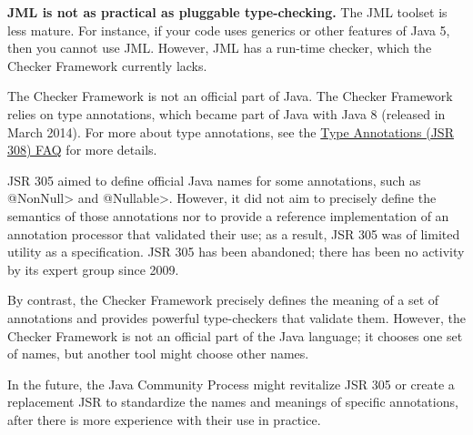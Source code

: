 \textbf{JML is not as practical as pluggable type-checking.}
The JML toolset is less mature.  For instance, if your code uses
generics or other features of Java 5, then you cannot use JML.
However, JML has a run-time checker, which the Checker Framework currently
lacks.



The Checker Framework is not an official part of Java.
The Checker Framework relies on type annotations, which became part of Java
with Java 8 (released in March 2014).  For more about type annotations, see the
\href{https://checkerframework.org/jsr308/jsr308-faq.html#pluggable-type-checking-in-java}{Type
  Annotations (JSR 308) FAQ} for more details.



JSR 305 aimed to define official Java names for some annotations, such as
\<@NonNull> and \<@Nullable>.  However, it did not aim to precisely define
the semantics of those annotations nor to provide a reference
implementation of an annotation processor that validated their use;
as a result, JSR 305 was of limited utility as a specification.
JSR 305 has been abandoned; there has been
no activity by its expert group since
2009.

By contrast, the Checker Framework precisely defines the meaning of a set
of annotations and provides powerful type-checkers that validate them.
However, the Checker Framework is not an official part of the Java
language; it chooses one set of names, but another tool might choose other
names.

In the future, the Java Community Process might revitalize JSR 305 or
create a replacement JSR to standardize the names and
meanings of specific annotations, after there is more experience with their
use in practice.



